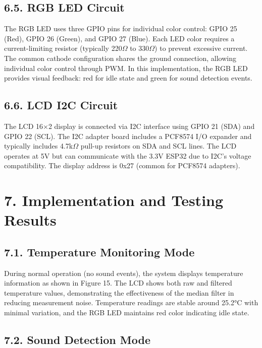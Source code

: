 \documentclass[12pt]{article}
\begin{document}
\subsection*{6.5. RGB LED Circuit}

The RGB LED uses three GPIO pins for individual color control: GPIO 25 (Red), GPIO 26 (Green), and GPIO 27 (Blue). Each LED color requires a current-limiting resistor (typically 220$\Omega$ to 330$\Omega$) to prevent excessive current. The common cathode configuration shares the ground connection, allowing individual color control through PWM. In this implementation, the RGB LED provides visual feedback: red for idle state and green for sound detection events.

\subsection*{6.6. LCD I2C Circuit}

The LCD 16×2 display is connected via I2C interface using GPIO 21 (SDA) and GPIO 22 (SCL). The I2C adapter board includes a PCF8574 I/O expander and typically includes 4.7k$\Omega$ pull-up resistors on SDA and SCL lines. The LCD operates at 5V but can communicate with the 3.3V ESP32 due to I2C's voltage compatibility. The display address is 0x27 (common for PCF8574 adapters).

\section*{7. Implementation and Testing Results}

\subsection*{7.1. Temperature Monitoring Mode}

During normal operation (no sound events), the system displays temperature information as shown in Figure 15. The LCD shows both raw and filtered temperature values, demonstrating the effectiveness of the median filter in reducing measurement noise. Temperature readings are stable around 25.2°C with minimal variation, and the RGB LED maintains red color indicating idle state.

\subsection*{7.2. Sound Detection Mode}
\end{document}
